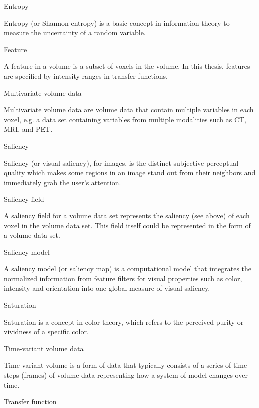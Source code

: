 \documentclass[a4paper, 12pt, twoside, openright]{report}         %
\begin{document}
\begin{description}
	
\item Entropy

Entropy (or Shannon entropy) is a basic concept in information theory to measure the uncertainty of a random variable.

\item Feature

A feature in a volume is a subset of voxels in the volume. In this thesis, features are specified by intensity ranges in transfer functions.

\item Multivariate volume data

Multivariate volume data are volume data that contain multiple variables in each voxel, e.g. a data set containing variables from multiple modalities such as CT, MRI, and PET.

\item Saliency

Saliency (or visual saliency), for images, is the distinct subjective perceptual quality which makes some regions in an image stand out from their neighbors and immediately grab the user's attention.

\item Saliency field

A saliency field for a volume data set represents the saliency (see above) of each voxel in the volume data set. This field itself could be represented in the form of a volume data set.

\item Saliency model

A saliency model (or saliency map) is a computational model that integrates the normalized information from feature filters for visual properties such as color, intensity and orientation into one global measure of visual saliency.

\item Saturation

Saturation is a concept in color theory, which refers to the perceived purity or vividness of a specific color.

\item Time-variant volume data

Time-variant volume is a form of data that typically consists of a series of time-steps (frames) of volume data representing how a system of model changes over time.

\item Transfer function


\end{description}
\end{document}
